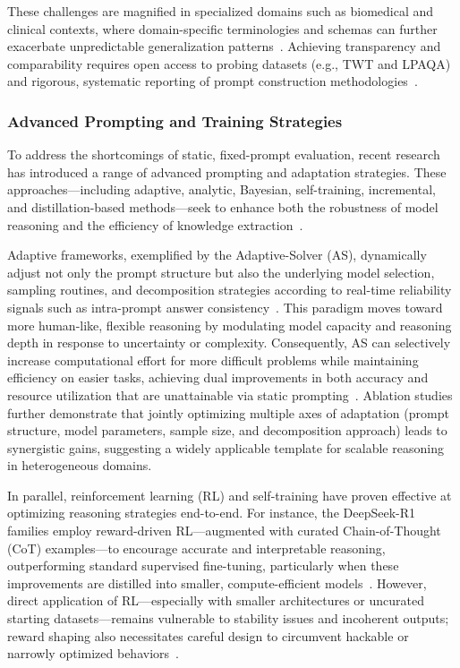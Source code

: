These challenges are magnified in specialized domains such as biomedical and clinical contexts, where domain-specific terminologies and schemas can further exacerbate unpredictable generalization patterns~\cite{ref94,ref95}. Achieving transparency and comparability requires open access to probing datasets (e.g., TWT and LPAQA) and rigorous, systematic reporting of prompt construction methodologies~\cite{ref96,ref98}.

\subsubsection{Advanced Prompting and Training Strategies}

To address the shortcomings of static, fixed-prompt evaluation, recent research has introduced a range of advanced prompting and adaptation strategies. These approaches---including adaptive, analytic, Bayesian, self-training, incremental, and distillation-based methods---seek to enhance both the robustness of model reasoning and the efficiency of knowledge extraction~\cite{ref1,ref4,ref6,ref49,ref56,ref57,ref68,ref86,ref103}.

Adaptive frameworks, exemplified by the Adaptive-Solver (AS), dynamically adjust not only the prompt structure but also the underlying model selection, sampling routines, and decomposition strategies according to real-time reliability signals such as intra-prompt answer consistency~\cite{ref57}. This paradigm moves toward more human-like, flexible reasoning by modulating model capacity and reasoning depth in response to uncertainty or complexity. Consequently, AS can selectively increase computational effort for more difficult problems while maintaining efficiency on easier tasks, achieving dual improvements in both accuracy and resource utilization that are unattainable via static prompting~\cite{ref57}. Ablation studies further demonstrate that jointly optimizing multiple axes of adaptation (prompt structure, model parameters, sample size, and decomposition approach) leads to synergistic gains, suggesting a widely applicable template for scalable reasoning in heterogeneous domains.

In parallel, reinforcement learning (RL) and self-training have proven effective at optimizing reasoning strategies end-to-end. For instance, the DeepSeek-R1 families employ reward-driven RL---augmented with curated Chain-of-Thought (CoT) examples---to encourage accurate and interpretable reasoning, outperforming standard supervised fine-tuning, particularly when these improvements are distilled into smaller, compute-efficient models~\cite{ref56,ref103}. However, direct application of RL---especially with smaller architectures or uncurated starting datasets---remains vulnerable to stability issues and incoherent outputs; reward shaping also necessitates careful design to circumvent hackable or narrowly optimized behaviors~\cite{ref56,ref103}.

